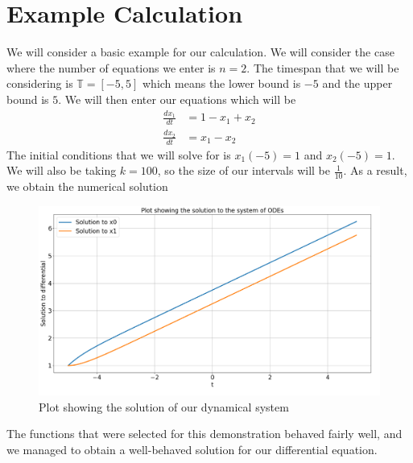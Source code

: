 \documentclass[12pt]{report}
\begin{document}
\section*{Example Calculation}
We will consider a basic example for our calculation. We will consider the case where the number of equations we enter is $n = 2$. The timespan that we will be considering is $\mathbb{T} = [-5,5]$ which means the lower bound is $-5$ and the upper bound is $5$. We will then enter our equations which will be 
\begin{equation*}
    \begin{split}
        \frac{dx_{1}}{dt} &= 1 - x_{1} + x_{2} \\
        \frac{dx_{2}}{dt} &= x_{1} - x_{2}
    \end{split}
\end{equation*}
The initial conditions that we will solve for is $x_{1}(-5) = 1$ and $x_{2}(-5) = 1$. We will also be taking $k = 100$, so the size of our intervals will be $\frac{1}{10}$. As a result, we obtain the numerical solution
\begin{figure}[H]
    \centering
    \includegraphics[scale = 0.36]{Demo 4.png}
    \caption{Plot showing the solution of our dynamical system}
\end{figure}
The functions that were selected for this demonstration behaved fairly well, and we managed to obtain a well-behaved solution for our differential equation.
\end{document}
